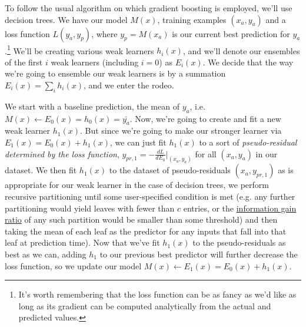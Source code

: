 \documentclass[letterpaper,12pt]{report}
\begin{document}
To follow the usual algorithm
on which gradient boosting is employed, we'll use decision trees.
We have our model \(M(x)\), training examples \((x_a, y_a)\) and a loss function
\(L(y_a, y_p)\), where \(y_p = M(x_a)\) is our current best prediction for \(y_a\).\footnote{
  It's worth
  remembering that the loss function can be as fancy as we'd like as long as its gradient
  can be computed analytically from the actual and predicted values.
}
We'll be creating various weak learners \(h_i(x)\), and we'll denote our ensembles of the first
\(i\) weak learners (including \(i=0\)) as \(E_i(x)\). We decide that the way we're going
to ensemble our weak learners is by a summation \(E_i(x) = \sum_{i} h_i(x)\),
and we enter the rodeo.

We start with a baseline prediction, the mean of \(y_a\), i.e. 
\(M(x) \leftarrow E_0(x) = h_0(x) = \bar{y_a}\).
Now, we're going to create and fit a new weak learner \(h_1(x)\). But since we're going to
make our stronger learner via \(E_1(x) = E_0(x) + h_1(x)\), we can just fit \(h_1(x)\)
to a sort of \emph{pseudo-residual determined by the loss function}, 
\(y_{pr,1} = - \frac{dL}{dE_0} \Bigr|_{\left(x_a, y_a\right)}\) 
for all \(\left(x_a, y_a\right)\) in our dataset. 
We then fit \(h_1(x)\) to the dataset of
pseudo-residuals \((x_a, y_{pr,1})\) as is appropriate for our weak learner \textemdash{}
in the case of decision trees, we perform recursive partitioning until some 
user-specified condition is met (e.g. any further partitioning would yield leaves with
fewer than \(c\) entries, or the \href{https://en.wikipedia.org/wiki/Information_gain_ratio}
{information gain ratio} of any such partition would be smaller
than some threshold) and then taking the mean of each leaf as the predictor for any
inputs that fall into that leaf at prediction time).
Now that we've fit \(h_1(x)\) to the pseudo-residuals as best as we can, adding \(h_1\) to our
previous best predictor will further decrease the loss function, so we 
update our model \(M(x) \leftarrow E_1(x) = E_0(x) + h_1(x)\). 
\end{document}
